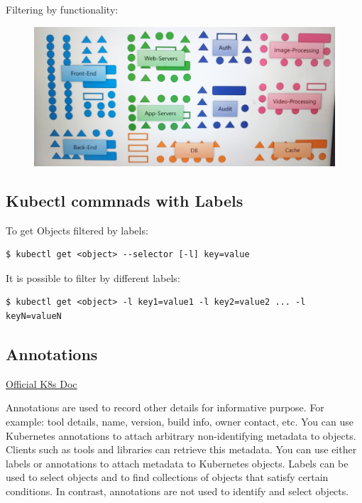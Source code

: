 \documentclass{article}
\newenvironment{codetemplate}[1][]{%
  \mybasecolorbox[#1]
  \itshape
}{%
  \endmybasecolorbox
}
\begin{document}
Filtering by functionality:

\begin{figure}[H]
    \centering
    \includegraphics[width=\textwidth]{pictures/sch3.png}
\end{figure}

\subsection{Kubectl commnads with Labels}

To get Objects filtered by labels:
\begin{codetemplate}{}
\begin{verbatim}
$ kubectl get <object> --selector [-l] key=value
\end{verbatim}
\end{codetemplate}

It is possible to filter by different labels:
\begin{codetemplate}{}
\begin{verbatim}
$ kubectl get <object> -l key1=value1 -l key2=value2 ... -l keyN=valueN
\end{verbatim}
\end{codetemplate}

\subsection{Annotations}

\href{https://kubernetes.io/docs/concepts/overview/working-with-objects/annotations/}{Official K8s Doc}

Annotations are used to record other details for informative purpose. For example: tool details, name, version, build info, owner contact, etc. You can use Kubernetes annotations to attach arbitrary non-identifying metadata to objects. Clients such as tools and libraries can retrieve this metadata. You can use either labels or annotations to attach metadata to Kubernetes objects. Labels can be used to select objects and to find collections of objects that satisfy certain conditions. In contrast, annotations are not used to identify and select objects.
\end{document}
